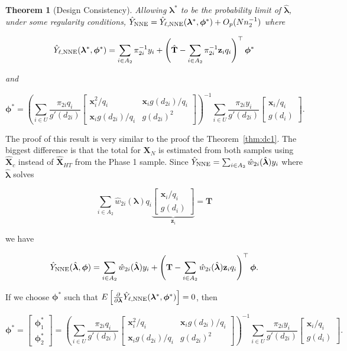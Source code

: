 \documentclass[12pt]{article}
\newtheorem{theorem}{Theorem}
\renewcommand{\bf}[1]{\mathbf{#1}}
\begin{document}
\begin{theorem}[Design Consistency]\label{thm:dc2}
  Allowing $\bm \lambda^*$ to be the probability limit of $\hat{\bm \lambda}$,
  under some regularity conditions, 
  $\hat Y_{\rm NNE} = \hat Y_{\ell, \rm NNE}(\bm \lambda^*,
  \bm \phi^*) + O_p(Nn_2^{-1})$ where

  $$
  \hat Y_{\ell, \rm NNE}(\bm \lambda^*, \bm \phi^*) = 
  \sum_{i \in A_2} \pi_{2i}^{-1} y_i + 
  \left(\hat{\bf T} - \sum_{i \in A_2} \pi_{2i}^{-1} \bf z_i q_i\right)^\top \bm \phi^*
  $$

  and 

  $$
  \bm \phi^* =
  \left(\sum_{i \in U} \frac{\pi_{2i} q_i}{g'(d_{2i})} 
  \begin{bmatrix}
    \bf x_i^2 / q_i & \bf x_i g(d_{2i}) / q_i \\
    \bf x_i g(d_{2i}) / q_i & g(d_{2i})^2
  \end{bmatrix}
  \right)^{-1}
  \sum_{i \in U} \frac{\pi_{2i} y_i}{g'(d_{2i})} 
  \begin{bmatrix} \bf x_i / q_i \\ g(d_i) \end{bmatrix}.
  $$
\end{theorem}

The proof of this result is very similar to the proof the
Theorem~\ref{thm:dc1}. The biggest difference is that the total for $\bf X_N$ is
estimated from both samples using $\hat{\bf X}_c$ instead of 
$\hat{\bf X}_{HT}$ from the Phase 1 sample. 
Since $\hat Y_{\rm NNE} = \sum_{i \in A_2} \hat w_{2i}(\hat{\bm \lambda})y_i$
where $\hat{\bm \lambda}$ solves

\begin{equation}
  \sum_{i \in A_2} \hat w_{2i}(\bm \lambda) q_i
  \underbrace{
  \begin{bmatrix} 
    \bf x_i / q_i \\ g(d_i)
\end{bmatrix}}_{\bf z_i} = \bf T
\end{equation}

we have 

$$\hat Y_{\rm NNE} (\hat{\bm \lambda}, \bm \phi) = \sum_{i \in A_2} \hat
w_{2i}(\hat{\bm \lambda})y_i + \left(\bf T - \sum_{i \in A_2} \hat
w_{2i}(\hat{\bm \lambda}) \bf z_i q_i\right)^\top \bm \phi.$$

If we choose $\bm \phi^*$ such that $E\left[\frac{\partial}{\partial \bm \lambda} 
  \hat Y_{\ell, \rm NNE}(\bm \lambda^*, \bm \phi^*)\right] = 0$, then

$$\bm \phi^* =
\begin{bmatrix}
  \bm \phi^*_1 \\ \bm \phi^*_2
\end{bmatrix} = 
\left(\sum_{i \in U} \frac{\pi_{2i} q_i}{g'(d_{2i})} 
\begin{bmatrix}
  \bf x_i^2 / q_i & \bf x_i g(d_{2i}) / q_i \\
  \bf x_i g(d_{2i}) / q_i & g(d_{2i})^2
\end{bmatrix}
\right)^{-1}
\sum_{i \in U} \frac{\pi_{2i} y_i}{g'(d_{2i})} 
\begin{bmatrix} \bf x_i / q_i \\ g(d_i) \end{bmatrix}.
$$
\end{document}
